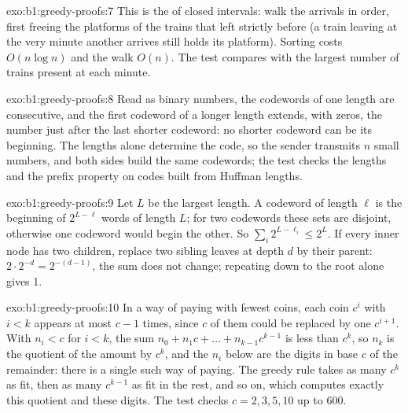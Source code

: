 \begin{solution}{exo:b1:greedy-proofs:7}
This is the  of closed intervals: walk the arrivals in order, first freeing the platforms of the trains
that left strictly before (a train leaving at the very minute another arrives still holds its platform). Sorting costs
$O(n \log n)$ and the walk $O(n)$. The test compares with the largest number of trains present at each minute.
\end{solution}

\begin{solution}{exo:b1:greedy-proofs:8}
Read as binary numbers, the codewords of one length are consecutive, and the first codeword of a longer length extends,
with zeros, the number just after the last shorter codeword: no shorter codeword can be its beginning. The lengths alone
determine the code, so the sender transmits $n$ small numbers, and both sides build the same codewords; the test checks
the lengths and the prefix property on codes built from Huffman lengths.
\end{solution}

\begin{solution}{exo:b1:greedy-proofs:9}
Let $L$ be the largest length. A codeword of length $\ell$ is the beginning of $2^{L - \ell}$ words of length $L$; for
two codewords these sets are disjoint, otherwise one codeword would begin the other. So $\sum_i 2^{L - \ell_i} \leq
2^L$. If every inner node has two children, replace two sibling leaves at depth $d$ by their parent: $2 \cdot 2^{-d} =
2^{-(d - 1)}$, the sum does not change; repeating down to the root alone gives 1.
\end{solution}

\begin{solution}{exo:b1:greedy-proofs:10}
In a way of paying with fewest coins, each coin $c^i$ with $i < k$ appears at most $c - 1$ times, since $c$ of them could
be replaced by one $c^{i+1}$. With $n_i < c$ for $i < k$, the sum $n_0 + n_1 c + \dots + n_{k-1} c^{k-1}$ is less than
$c^k$, so $n_k$ is the quotient of the amount by $c^k$, and the $n_i$ below are the digits in base $c$ of the remainder:
there is a single such way of paying. The greedy rule takes as many $c^k$ as fit, then as many $c^{k-1}$ as fit in the
rest, and so on, which computes exactly this quotient and these digits. The test checks $c = 2, 3, 5, 10$ up to 600.
\end{solution}

